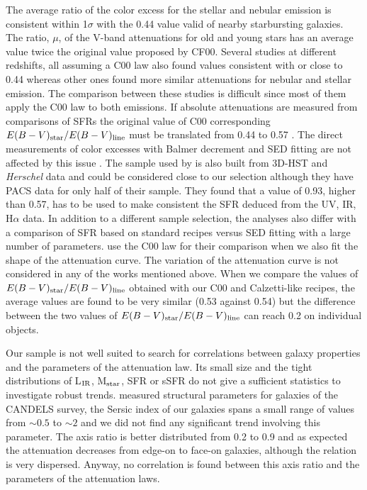 \documentclass{aa}
\begin{document}
The average ratio of the color excess for the stellar and nebular emission is consistent within 1$\sigma$  with the 0.44 value valid of nearby starbursting galaxies.  The ratio, $\mu$, of the V-band attenuations for old and young stars has an average value twice the original value proposed by CF00. Several studies  at different redshifts, all assuming a C00 law also found values consistent with  or close to 0.44 \citep{Garn10-2, Price14, Mancini11, Wuyts11} whereas other ones \citep{Kashino13,Puglisi16} found more similar attenuations for nebular and stellar emission. The comparison between these studies is difficult since most of them apply the C00 law to both emissions. If absolute attenuations are measured from comparisons of  SFRs \citep{Garn10-2, Mancini11, Wuyts11} the original value of C00 corresponding $E(B-V)_{\rm star}/E(B-V)_{\rm line}$  must be  translated from 0.44 to 0.57 \citep[e.g.,][]{Pannella15}. The direct measurements of color excesses with Balmer decrement and SED fitting are not affected by this issue \citep{Kashino13, Price14}. The sample used by  \citet{Puglisi16} is also built from 3D-HST and {\it Herschel} data and could be considered close to our selection although they  have PACS  data for  only half of their sample. They found that a value of 0.93, higher than 0.57, has to be used to make consistent the SFR deduced from the UV, IR, H$\alpha$  data. In addition to a different sample selection, the   analyses also differ  with a comparison of SFR based on standard recipes versus SED fitting with a large number of parameters.  \citet{Puglisi16} use the C00 law for their comparison when we also fit the shape of the attenuation curve. The variation of the attenuation curve is not considered in any of the works mentioned above. When we compare the values of $E(B-V)_{\rm star}/E(B-V)_{\rm line}$  obtained with our C00 and  Calzetti-like recipes, the average values are found to be very similar (0.53 against 0.54) but  the difference between the two values of $E(B-V)_{\rm star}/E(B-V)_{\rm line}$ can reach 0.2 on individual objects.
 
Our sample is not well suited to search for correlations between galaxy properties and the parameters of the attenuation law. Its small size and the tight distributions of L$_{\rm IR}$, M$_{\rm star}$,  SFR or sSFR do not give a sufficient statistics to investigate robust trends. \citet{vanderWel12}  measured structural parameters  for  galaxies of the CANDELS survey, the Sersic index of our galaxies spans a small range of values from $\sim 0.5$ to $\sim 2$ and we did not find any significant trend involving this parameter. The axis ratio is better distributed from 0.2 to 0.9 and as expected the attenuation decreases from edge-on to face-on galaxies, although the relation is very dispersed. Anyway, no correlation is found between this axis ratio and the parameters of the attenuation laws.
\end{document}
